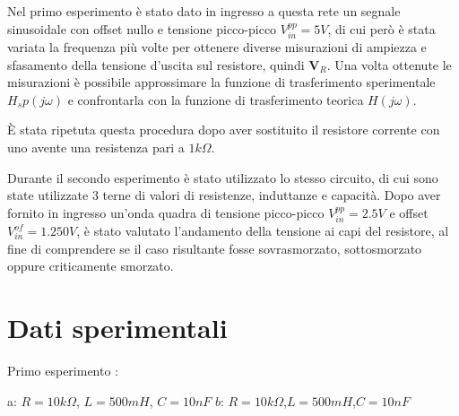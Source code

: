     Nel primo esperimento è stato dato in ingresso a questa rete un segnale sinusoidale con offset nullo e 
    tensione picco-picco $V^{pp}_{in} = 5V$, di cui però è stata variata la frequenza più volte per ottenere diverse misurazioni
    di ampiezza e sfasamento della tensione d'uscita sul resistore, quindi $\mathbf{V}_R$.
    Una volta ottenute le misurazioni è possibile approssimare la funzione di trasferimento sperimentale $H_sp(j\omega)$
    e confrontarla con la funzione di trasferimento teorica $H(j\omega)$.\par
    È stata ripetuta questa procedura dopo aver sostituito il resistore corrente con uno avente una resistenza
    pari a $1k\Omega$. \par
    Durante il secondo esperimento è stato utilizzato lo stesso circuito, di cui sono state utilizzate 3 terne di valori di
    resistenze, induttanze e capacità. Dopo aver fornito in ingresso un'onda quadra di tensione picco-picco $V^{pp}_{in} = 2.5 V$
    e offset $V^{of}_{in} = 1.250 V$, è stato valutato l'andamento della tensione ai capi del resistore, al fine 
    di comprendere se il caso risultante fosse sovrasmorzato, sottosmorzato oppure criticamente smorzato. \par

    
    \section{Dati sperimentali}
    Primo esperimento : \par
    a: $R=10k\Omega$, $L=500mH$, $C=10nF$ \hspace{2.4cm} $b$: $R = 10k\Omega$,$L = 500mH $,$C = 10nF$
    

